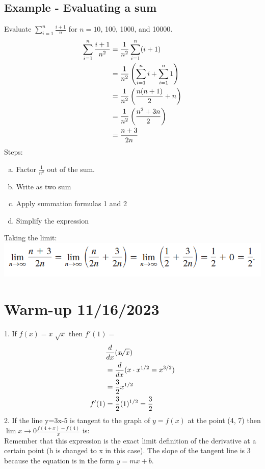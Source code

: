 \documentclass[11pt]{article}
\newcommand*{\set}{\setcounter{equation}{0}}
\begin{document}
\subsection{Example - Evaluating a sum}
Evaluate $\sum_{i=1}^{n}\frac{i+1}{n}$ for $n=10$, 100, 1000, and 10000.
\begin{align}
    \set
    \sum_{i=1}^{n}\frac{i+1}{n^2}&=\frac{1}{n^2}\sum_{i=1}^{n}(i+1)\\
    &=\frac{1}{n^2}\left(\sum_{i=1}^{n}i+\sum_{i=1}^{n}1\right)\\
    &=\frac{1}{n^2}\left(\frac{n(n+1)}{2}+n\right)\\
    &=\frac{1}{n^2}\left(\frac{n^2+3n}{2}\right)\\
    &=\frac{n+3}{2n}
\end{align}
Steps:
\begin{enumerate}[(a)]
    \item Factor $\frac{1}{n^2}$ out of the sum.
    \item Write as two sum
    \item Apply summation formulas 1 and 2
    \item Simplify the expression
\end{enumerate}

Taking the limit:\\
\includegraphics{limit.png}

\section{Warm-up 11/16/2023}
1. If $f(x)=x\sqrt[]{x}$ then $f'(1)=$
\begin{align}
    \set
    &\frac{d}{dx}(x\sqrt[]{x})\\
    &=\frac{d}{dx}(x\cdot x^{1/2}=x^{3/2})\\
    &=\frac{3}{2}x^{1/2}\\
    f'(1)&=\frac{3}{2}(1)^{1/2}=\frac{3}{2}
\end{align}
2. If the line y=3x-5 is tangent to the graph of $y=f(x)$ at the point (4, 7) then $\lim{x\to 0}\frac{f(4+x)-f(4)}{x}$ is:\\
\indent Remember that this expression is the exact limit definition of the derivative at a certain point (h is changed to x in this case). The slope of the tangent line is 3 because the equation is in the form $y=mx+b$. 
\end{document}
